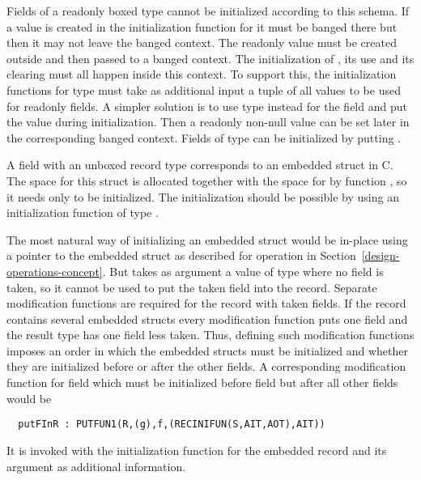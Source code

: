 Fields of a readonly boxed type  cannot be initialized according to this schema. If a value is created in the 
initialization function for  it must be banged there but then it may not leave the banged context. The readonly value must be created
outside and then passed to a banged context. The initialization of , its use and its clearing must all happen inside
this context. To support this, the initialization functions for type  must take as additional input a tuple of all
values to be used for readonly fields. A simpler solution is to use type  instead for the field and 
put the value  during initialization. Then a readonly non-null value can be set later in the corresponding
banged context. Fields of type  can be initialized by putting .

A field  with an unboxed record type  corresponds to an embedded struct in C. The space for this struct is allocated together
with the space for  by function , so it needs only to be initialized. The initialization should be possible by using
an initialization function of type .

The most natural way of initializing an embedded struct would be in-place using a pointer to the embedded struct as described
for operation  in Section~\ref{design-operations-concept}. But  takes as argument a value of type 
where no field is taken, so it cannot be used to put the taken field  into the record. Separate modification functions
are required for the record with taken fields. If the record contains several embedded structs every modification function
puts one field and the result type has one field less taken. Thus, defining such modification functions imposes an order
in which the embedded structs must be initialized and whether they are initialized before or after the other fields. A corresponding
modification function for field  which must be initialized before field  but after all other fields would be
\begin{verbatim}
  putFInR : PUTFUN1(R,(g),f,(RECINIFUN(S,AIT,AOT),AIT))
\end{verbatim}
It is invoked with the initialization function for the embedded record and its argument 
as additional information.

